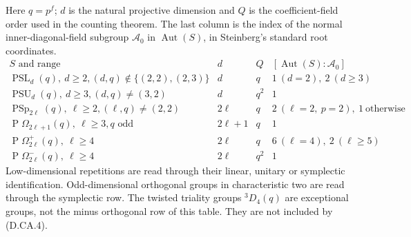 \begin{corollary}
Here $q=p^f$; $d$ is the natural projective dimension and
$Q$ is the coefficient-field order used in the counting
theorem. The last column is the index of the normal
inner-diagonal-field subgroup $\mathcal A_0$ in
$\operatorname{Aut}(S)$, in Steinberg's standard root
coordinates.
\[
\begin{array}{c|c|c|c}
 S\text{ and range}&d&Q&[\operatorname{Aut}(S):\mathcal A_0]\\ \hline
 \operatorname{PSL}_d(q),\ d\geq2,
       (d,q)\notin\{(2,2),(2,3)\}
       &d&q&1\ (d=2),\ 2\ (d\geq3)\\
 \operatorname{PSU}_d(q),\ d\geq3,
       (d,q)\ne(3,2)
       &d&q^2&1\\
 \operatorname{PSp}_{2\ell}(q),\ \ell\geq2,
       (\ell,q)\ne(2,2)
       &2\ell&q&2\ (\ell=2,\ p=2),\ 1\ \text{otherwise}\\
 \operatorname{P}\Omega_{2\ell+1}(q),\ \ell\geq3,
       q\text{ odd}
       &2\ell+1&q&1\\
 \operatorname{P}\Omega^+_{2\ell}(q),\ \ell\geq4
       &2\ell&q&6\ (\ell=4),\ 2\ (\ell\geq5)\\
 \operatorname{P}\Omega^-_{2\ell}(q),\ \ell\geq4
       &2\ell&q^2&1
\end{array}                                             \tag{D.CA.4}
\]
Low-dimensional repetitions are read through their
linear, unitary or symplectic identification. Odd-dimensional
orthogonal groups in characteristic two are read through
the symplectic row. The twisted triality groups ${}^3D_4(q)$
are exceptional groups, not the minus orthogonal row of
this table. They are not included by (D.CA.4).
\end{corollary}

